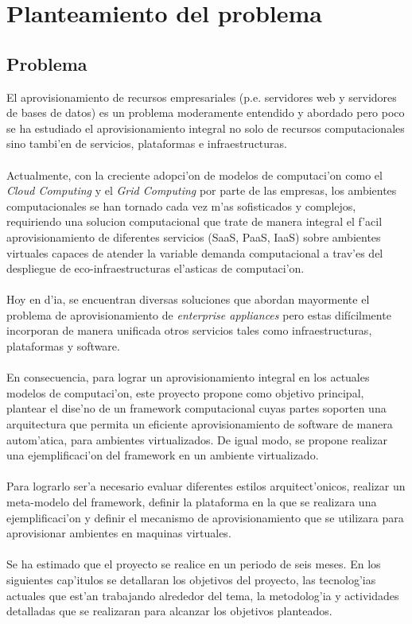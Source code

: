 \chapter{Planteamiento del problema}
\label{capproblema}

\section{Problema}
El aprovisionamiento de recursos empresariales (p.e. servidores web y servidores de bases de datos) es un problema moderamente entendido y abordado pero poco se ha estudiado el aprovisionamiento integral no solo de recursos computacionales sino tambi'en de servicios, plataformas e infraestructuras.\\
\\
Actualmente, con la creciente adopci'on de modelos de computaci'on como el \emph{Cloud Computing} y el \emph{Grid Computing} por parte de las empresas, los ambientes computacionales se han tornado cada vez m'as sofisticados y complejos, requiriendo una solucion computacional que trate de manera integral el f'acil aprovisionamiento de diferentes servicios (SaaS, PaaS, IaaS) sobre ambientes virtuales capaces de atender la variable demanda computacional a trav'es del despliegue de eco-infraestructuras el'asticas de computaci'on.\\
\\
Hoy en d'ia, se encuentran diversas soluciones que abordan mayormente el problema de aprovisionamiento de \emph{enterprise appliances} pero estas dif\'icilmente incorporan  de manera unificada otros servicios tales como infraestructuras, plataformas y software.\\
\\
En consecuencia, para lograr un aprovisionamiento integral en los actuales modelos de computaci'on, este proyecto propone como objetivo principal, plantear el dise'no de un framework computacional cuyas partes soporten una arquitectura que permita un eficiente aprovisionamiento de software de manera autom'atica, para ambientes virtualizados. De igual modo, se propone realizar una ejemplificaci'on del framework en un ambiente virtualizado.\\
\\
Para lograrlo ser'a necesario evaluar diferentes estilos arquitect'onicos, realizar un meta-modelo del framework, definir la plataforma en la que se realizara una ejemplificaci'on y definir el mecanismo de aprovisionamiento que se utilizara para aprovisionar ambientes en maquinas virtuales.\\ 
\\
Se ha estimado que el proyecto se realice en un periodo de seis meses. En los siguientes cap'itulos se detallaran los objetivos del proyecto, las tecnolog'ias actuales que est'an trabajando alrededor del tema, la metodolog'ia y actividades detalladas que se realizaran para alcanzar los objetivos planteados.

